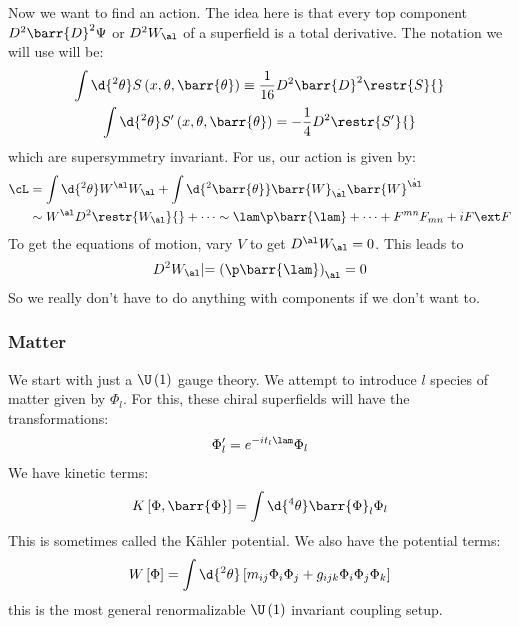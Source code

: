 \documentclass{booc}
\begin{document}
Now we want to find an action.
The idea here is that every top component $D^2 \barr{D}^2 \Psi$
or $D^2 W_\al$ of a superfield is a total derivative.
The notation we will use will be:
\begin{gather}
\int \d{^2 \theta} S\left( x , \theta , \barr{\theta} \right) \equiv 
\frac{1}{16} D^2 \barr{D}^2 \restr{S}{}
\\
\int \d{^2 \theta} S'\left( x , \theta , \barr{\theta} \right)
= -\frac{1}{4} D^2 \restr{S'}{}
\end{gather}
which are supersymmetry invariant. 
For us, our action is given by:
\begin{align}
\cL& = \int \d{^2 \theta}W^\al W_\al + 
\int \d{^2\barr{\theta}} \barr{W}_{\dot{\al}}\barr{W}^{\dot{\al}}\\
&\sim W^{\al} D^2 \restr{W_\al}{} + \cdots
\sim \lam \p \barr{\lam} + \cdots + F^{mn}F_{mn} + i F\ext F
\end{align}
To get the equations of motion, vary $V$ to get $D^\al W_\al = 0$.
This leads to 
\begin{equation}
D^2 W_\al\lvert = \left( \p \barr{\lam} \right)_\al = 0
\end{equation}
So we really don't have to do anything with components if we don't want to.

\subsubsection{Matter}

We start with just a $\U\left( 1 \right)$ gauge theory. 
We attempt to introduce $l$ species of matter given by $\Phi_l$.
For this, these chiral superfields will have the transformations:
\begin{align}
\Phi'_l = e^{-i t_l \lam} \Phi_l
\end{align}
We have kinetic terms:
\begin{equation}
K\left[ \Phi , \barr{\Phi} \right] = \int \d{^4 \theta} \barr{\Phi}_l \Phi_l
\end{equation}
This is sometimes called the K\"ahler potential.
We also have the potential terms:
\begin{equation}
W\left[ \Phi \right] =
\int \d{^2 \theta} \left[ m_{ij} \Phi_i \Phi_j + g_{ijk} \Phi_i \Phi_j \Phi_k \right]
\end{equation}
this is the most general renormalizable $\U\left( 1 \right)$ invariant coupling setup.
\end{document}
